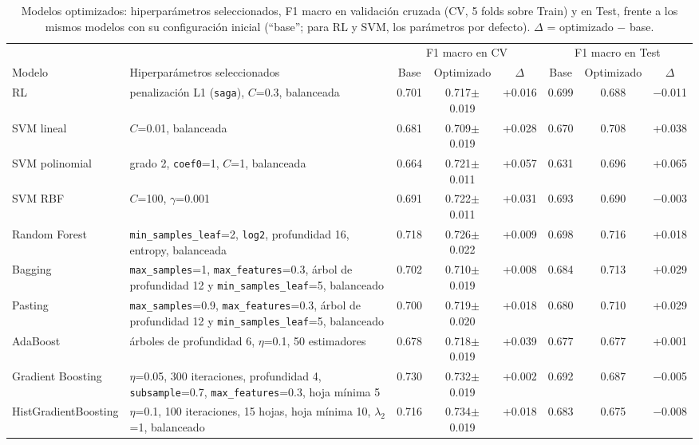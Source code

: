 \begin{table}[t]
\caption{Modelos optimizados: hiperparámetros seleccionados, F1 macro en validación cruzada (CV, 5 folds sobre Train) y en Test, frente a los mismos modelos con su configuración inicial (``base''; para RL y SVM, los parámetros por defecto). $\Delta$ = optimizado $-$ base.}
\label{tab:opt}
\centering\scriptsize
\setlength{\tabcolsep}{3pt}
\begin{tabular}{@{}p{2.6cm}p{6.5cm}cccccc@{}}
\toprule
 & & \multicolumn{3}{c}{F1 macro en CV} & \multicolumn{3}{c}{F1 macro en Test} \\
\cmidrule(lr){3-5}\cmidrule(lr){6-8}
Modelo & Hiperparámetros seleccionados & Base & Optimizado & $\Delta$ & Base & Optimizado & $\Delta$ \\
\midrule
RL & penalización L1 (\texttt{saga}), $C$=0.3, balanceada & 0.701 & 0.717$\pm$0.019 & +0.016 & 0.699 & 0.688 & $-$0.011 \\
SVM lineal & $C$=0.01, balanceada & 0.681 & 0.709$\pm$0.019 & +0.028 & 0.670 & 0.708 & +0.038 \\
SVM polinomial & grado 2, \texttt{coef0}=1, $C$=1, balanceada & 0.664 & 0.721$\pm$0.011 & +0.057 & 0.631 & 0.696 & +0.065 \\
SVM RBF & $C$=100, $\gamma$=0.001 & 0.691 & 0.722$\pm$0.011 & +0.031 & 0.693 & 0.690 & $-$0.003 \\
Random Forest & \texttt{min\_samples\_leaf}=2, \texttt{log2}, profundidad 16, entropy, balanceada & 0.718 & 0.726$\pm$0.022 & +0.009 & 0.698 & 0.716 & +0.018 \\
Bagging & \texttt{max\_samples}=1, \texttt{max\_features}=0.3, árbol de profundidad 12 y \texttt{min\_samples\_leaf}=5, balanceado & 0.702 & 0.710$\pm$0.019 & +0.008 & 0.684 & 0.713 & +0.029 \\
Pasting & \texttt{max\_samples}=0.9, \texttt{max\_features}=0.3, árbol de profundidad 12 y \texttt{min\_samples\_leaf}=5, balanceado & 0.700 & 0.719$\pm$0.020 & +0.018 & 0.680 & 0.710 & +0.029 \\
AdaBoost & árboles de profundidad 6, $\eta$=0.1, 50 estimadores & 0.678 & 0.718$\pm$0.019 & +0.039 & 0.677 & 0.677 & +0.001 \\
Gradient Boosting & $\eta$=0.05, 300 iteraciones, profundidad 4, \texttt{subsample}=0.7, \texttt{max\_features}=0.3, hoja mínima 5 & 0.730 & 0.732$\pm$0.019 & +0.002 & 0.692 & 0.687 & $-$0.005 \\
HistGradientBoosting & $\eta$=0.1, 100 iteraciones, 15 hojas, hoja mínima 10, $\lambda_2$=1, balanceado & 0.716 & 0.734$\pm$0.019 & +0.018 & 0.683 & 0.675 & $-$0.008 \\

\end{tabular}
\end{table}
